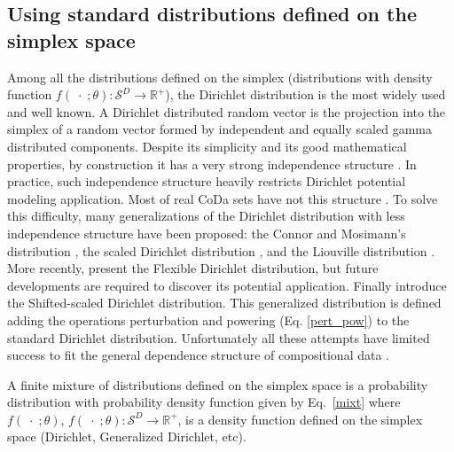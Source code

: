 \documentclass[10pt, a4paper]{article}
\begin{document}
\subsection{Using standard distributions defined on the simplex space}
\label{simplex_section}

\noindent Among all the distributions defined on the simplex (distributions with density function $f(\;\cdot\;;\theta): \mathcal{S}^D\rightarrow \mathbb{R}^+$), the Dirichlet distribution is the most widely used and well known. 
A Dirichlet distributed random vector is the projection into the simplex of a random vector formed by independent and equally scaled gamma distributed components. 
Despite its simplicity and its good mathematical properties, by construction it has a very strong independence structure \citep{aitchison1986statistical}. 
In practice, such independence structure heavily restricts Dirichlet potential modeling application. Most of real CoDa sets have
not this structure \citep{aitchison1986statistical}. To solve this difficulty, many generalizations of the Dirichlet distribution with less
independence structure have been proposed: the Connor and Mosimann's distribution
\citep{Connor:1969}, the scaled Dirichlet distribution \citep{aitchison1986statistical},  and the Liouville distribution \citep{rayens1994dependence}.  More recently, \cite{ongaro2008new} present the Flexible Dirichlet distribution, but future
developments are required to discover its potential application. Finally \cite{monti2011shifted} introduce the Shifted-scaled Dirichlet distribution. This generalized distribution is defined adding the operations
perturbation and powering (Eq. \ref{pert_pow}) to the standard Dirichlet distribution. Unfortunately all these attempts
have limited success to fit the general dependence structure of compositional data \citep{mateu2013normal}.

A finite mixture of distributions defined on the simplex space is a probability distribution with probability density function given by Eq.~\ref{mixt} where $f(\;\cdot\;;\theta)$, $f(\;\cdot\;;\theta): \mathcal{S}^D \rightarrow \mathbb{R}^+$, is a density function defined on the simplex space (Dirichlet, Generalized Dirichlet, etc).
\end{document}
